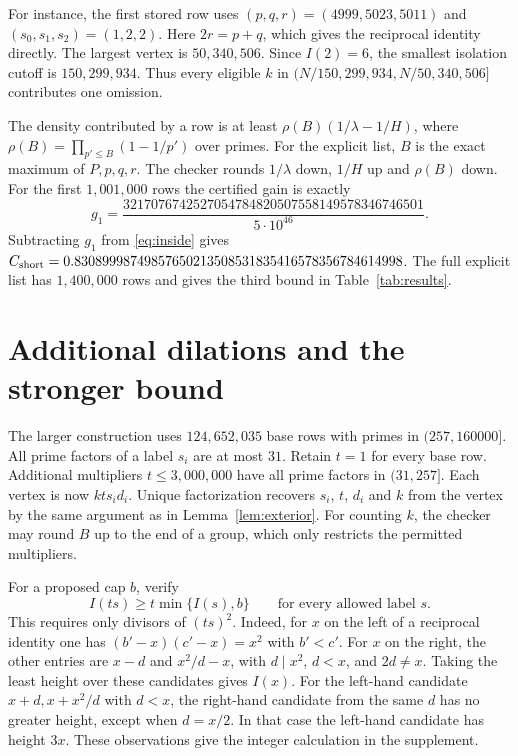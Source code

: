\documentclass[11pt,letterpaper]{article}
\theoremstyle{definition}
\newcommand{\cshort}{C_{\rm short}}
\begin{document}
For instance, the first stored row uses $(p,q,r)=(4999,5023,5011)$
and $(s_0,s_1,s_2)=(1,2,2)$. Here $2r=p+q$, which gives the
reciprocal identity directly. The largest vertex is $50{,}340{,}506$.
Since $I(2)=6$, the smallest isolation cutoff is $150{,}299{,}934$.
Thus every eligible $k$ in
$(N/150{,}299{,}934,N/50{,}340{,}506]$ contributes one omission.

The density contributed by a row is at least
$\rho(B)(1/\lambda-1/H)$, where
$\rho(B)=\prod_{p'\le B}(1-1/p')$ over primes. For the explicit list,
$B$ is the exact maximum of $P,p,q,r$. The checker rounds $1/\lambda$
down, $1/H$ up and $\rho(B)$ down. For the first $1{,}001{,}000$ rows
the certified gain is exactly
\[
 g_1=\frac{3217076742527054784820507558149578346746501}
                    {5\cdot10^{46}} .
\]
Subtracting $g_1$ from \eqref{eq:inside} gives
$\cshort=0.83089998749857650213508531835416578356784614998$.
The full explicit list has $1{,}400{,}000$ rows and gives the third
bound in Table~\ref{tab:results}.

\section{Additional dilations and the stronger bound}
The larger construction uses $124{,}652{,}035$ base rows with primes
in $(257,160000]$. All prime factors of a label $s_i$ are at most $31$.
Retain $t=1$ for every base row. Additional multipliers $t\le3{,}000{,}000$
have all prime factors in $(31,257]$. Each vertex is now $k t s_i d_i$.
Unique factorization recovers $s_i$, $t$, $d_i$ and $k$ from the
vertex by the same argument as in Lemma~\ref{lem:exterior}. For
counting $k$, the checker may round $B$ up to the end of a group,
which only restricts the permitted multipliers.

For a proposed cap $b$, verify
\begin{equation}
 I(t s)\ge t\min\{I(s),b\} \qquad\text{for every allowed label }s.
 \label{eq:scale}
\end{equation}
This requires only divisors of $(ts)^2$. Indeed, for $x$ on the left
of a reciprocal identity one has $(b'-x)(c'-x)=x^2$ with $b'<c'$.
For $x$ on the right, the other entries are $x-d$ and $x^2/d-x$,
with $d\mid x^2$, $d<x$, and $2d\ne x$. Taking the least height
over these candidates gives $I(x)$. For the left-hand candidate
$x+d,x+x^2/d$ with $d<x$, the right-hand candidate from the same
$d$ has no greater height, except when $d=x/2$. In that case the
left-hand candidate has height $3x$. These observations give the
integer calculation in the supplement.
\end{document}
